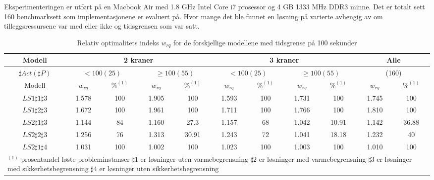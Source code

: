 Eksperimenteringen er utført på en Macbook Air med 1.8 GHz Intel Core i7 prosessor og 4 GB 1333 MHz DDR3 minne. Det er totalt sett 160 benchmarksett som implementasjonene er evaluert på. Hvor mange det ble funnet en løsning på varierte avhengig av om tilleggsressursene var med eller ikke og tidsgrensen som var satt.

\begin{table}[!h]
\caption{Relativ optimalitets indeks $w_{rq}$ for de forskjellige modellene med tidsgrense på 100 sekunder}
\begin{center}
\begin{tabular}{ | c | c | c | c | c | c | c | c | c | c | c | }
\hline
\textbf{Modell} & \multicolumn{4}{|c|}{\textbf{2 kraner}} & \multicolumn{4}{|c|}{\textbf{3 kraner}} & \multicolumn{2}{|c|}{\textbf{Alle}} \\ \hline
$\sharp Act(\sharp P)$ & \multicolumn{2}{|c|}{$< 100 (25)$} & \multicolumn{2}{|c|}{$\ge 100 (55)$} & \multicolumn{2}{|c|}{$< 100 (25)$} & \multicolumn{2}{|c|}{$\ge 100 (55)$} & \multicolumn{2}{|c|}{(160)} \\ 
\hline
Modell & $w_{rq}$ & $\%^{(1)}$ & $w_{rq}$ & $\%^{(1)}$  & $w_{rq}$ & $\%^{(1)}$ & $w_{rq}$ & $\%^{(1)}$ & $w_{rq}$ & $\%^{(1)}$ \\ \hline
$LS1 \sharp 1\sharp 3$ & 1.578 & 100 & 1.905 & 100 & 1.593 & 100 & 1.731 & 100 & 1.745 & 100 \\
$LS1 \sharp 2\sharp 3$ & 1.672 & 100 & 1.961 & 100 & 1.711 & 100 & 1.766 & 100 & 1.810 & 100 \\
$LS2 \sharp 1\sharp 3$ & 1.144 & 84 & 1.160 & 27.3 & 1.157 & 68 & 1.042 & 10.91 & 1.142 & 36.88 \\
$LS2 \sharp 2\sharp 3$ & 1.256 & 76 & 1.313 & 30.91 & 1.243 & 72 & 1.041 & 18.18 & 1.232 & 40 \\
$LS2 \sharp 1\sharp 4$ & 1.031 & 100 & 1.002 & 100 & 1.023 & 100 & 1.003 & 100 & 1.010 & 100 \\
\hline
\multicolumn{11}{l}{\begin{minipage}{6in}$^{(1)}$ prosentandel løste probleminstanser\newline
$\sharp 1$ er løsninger uten varmebegrensning\newline
$\sharp 2$ er løsninger med varmebegrensning \newline
$\sharp 3$ er løsninger med sikkerhetsbegrensning \newline
$\sharp 4$ er løsninger uten sikkerhetsbegrensning\end{minipage}}
\end{tabular}
\end{center}
\label{tab:resultaterSum100s}
\end{table}

